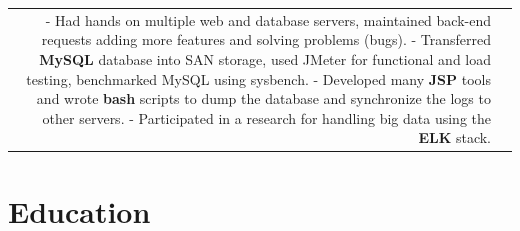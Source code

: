 \documentclass[a4paper,13pt]{article}
\begin{document}
\begin{adjustwidth}{-3cm}{}
\begin{tabular}{r|p{17.5cm}}
\footnotesize{
	- Had hands on multiple web and database servers, maintained back-end requests adding more features and solving problems (bugs).\newline 
	- Transferred \textbf{MySQL} database into SAN storage, used JMeter for functional and load testing, benchmarked MySQL using sysbench.\newline
	- Developed many \textbf{JSP} tools and wrote \textbf{bash} scripts to dump the database and synchronize the logs to other servers.\newline
	- Participated in a research for handling big data using the \textbf{ELK} stack.
}
\end{tabular}


\end{adjustwidth}


\section{Education}
\end{document}
